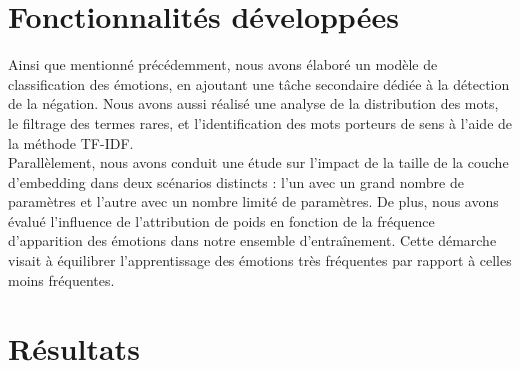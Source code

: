 \documentclass{article}
\begin{document}
\section{Fonctionnalités développées}
Ainsi que mentionné précédemment, nous avons élaboré un modèle de classification des émotions, en ajoutant une tâche secondaire dédiée à la détection de la négation. Nous avons aussi réalisé une analyse de la distribution des mots, le filtrage des termes rares, et l'identification des mots porteurs de sens à l'aide de la méthode TF-IDF. \\
Parallèlement, nous avons conduit une étude sur l'impact de la taille de la couche d'embedding dans deux scénarios distincts : l'un avec un grand nombre de paramètres et l'autre avec un nombre limité de paramètres. De plus, nous avons évalué l'influence de l'attribution de poids en fonction de la fréquence d'apparition des émotions dans notre ensemble d'entraînement. Cette démarche visait à équilibrer l'apprentissage des émotions très fréquentes par rapport à celles moins fréquentes.

\section{Résultats}
\end{document}
